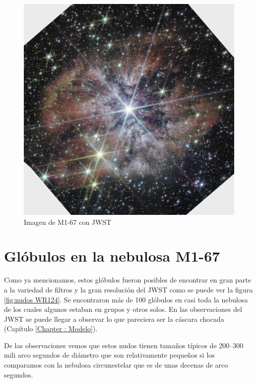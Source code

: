\documentclass{book}
\begin{document}
\begin{figure}[htb]
    \centering
    \includegraphics[width=\textwidth]{M1-67-JWST.jpg}
    \caption{Imagen de M1-67 con JWST}
    \label{fig:M1-67JWST}
\end{figure}

\section{Glóbulos en la nebulosa M1-67}

Como ya mencionamos, estos glóbulos fueron posibles de encontrar en gran parte a la variedad de filtros y la gran resolución del JWST como se puede ver la figura \ref{fig:nudos WR124}. Se encontraron más de 100 glóbulos en casi toda la nebulosa de los cuales algunos estaban en grupos y otros solos. En las observaciones del JWST se puede llegar a observar lo que pareciera ser la cáscara chocada (Capítulo \ref{Chapter : Modelo}).

De las observaciones vemos que estos nudos tienen tamaños típicos de 200--300 mili arco segundos de diámetro que son relativamente pequeños si los comparamos con la nebulosa circunestelar que es de unas decenas de arco segundos.
\end{document}
